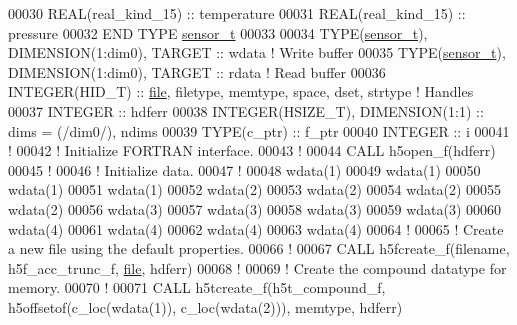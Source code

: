\begin{DoxyCode}
00030      \textcolor{keywordtype}{REAL(real\_kind\_15)} :: temperature
00031      \textcolor{keywordtype}{REAL(real\_kind\_15)} :: pressure
00032 \textcolor{keyword}{  END TYPE }\hyperlink{structsensor__t}{sensor\_t}
00033 
00034   \textcolor{keywordtype}{TYPE}(\hyperlink{structsensor__t}{sensor\_t}), \textcolor{keywordtype}{DIMENSION(1:dim0)}, \textcolor{keywordtype}{TARGET} ::  wdata \textcolor{comment}{! Write buffer}
00035   \textcolor{keywordtype}{TYPE}(\hyperlink{structsensor__t}{sensor\_t}), \textcolor{keywordtype}{DIMENSION(1:dim0)}, \textcolor{keywordtype}{TARGET} ::  rdata \textcolor{comment}{! Read buffer}
00036   \textcolor{keywordtype}{INTEGER(HID\_T)}  :: \hyperlink{structfile}{file}, filetype, memtype, space, dset, strtype \textcolor{comment}{! Handles}
00037   \textcolor{keywordtype}{INTEGER} :: hdferr
00038   \textcolor{keywordtype}{INTEGER(HSIZE\_T)}, \textcolor{keywordtype}{DIMENSION(1:1)}   :: dims = (/dim0/), ndims
00039   \textcolor{keywordtype}{TYPE}(c\_ptr) :: f\_ptr
00040   \textcolor{keywordtype}{INTEGER} :: i
00041   \textcolor{comment}{!}
00042   \textcolor{comment}{! Initialize FORTRAN interface.}
00043   \textcolor{comment}{!}
00044   \textcolor{keyword}{CALL }h5open\_f(hdferr)
00045   \textcolor{comment}{!}
00046   \textcolor{comment}{! Initialize data.}
00047   \textcolor{comment}{!}
00048   wdata(1)%
00049   wdata(1)%
00050   wdata(1)%
00051   wdata(1)%
00052   wdata(2)%
00053   wdata(2)%
00054   wdata(2)%
00055   wdata(2)%
00056   wdata(3)%
00057   wdata(3)%
00058   wdata(3)%
00059   wdata(3)%
00060   wdata(4)%
00061   wdata(4)%
00062   wdata(4)%
00063   wdata(4)%
00064   \textcolor{comment}{!}
00065   \textcolor{comment}{! Create a new file using the default properties.}
00066   \textcolor{comment}{!}
00067   \textcolor{keyword}{CALL }h5fcreate\_f(filename, h5f\_acc\_trunc\_f, \hyperlink{structfile}{file}, hdferr)
00068   \textcolor{comment}{!}
00069   \textcolor{comment}{! Create the compound datatype for memory.}
00070   \textcolor{comment}{!}
00071   \textcolor{keyword}{CALL }h5tcreate\_f(h5t\_compound\_f, h5offsetof(c\_loc(wdata(1)), c\_loc(wdata(2))), memtype, hdferr)

\end{DoxyCode}
